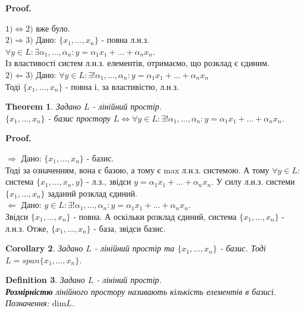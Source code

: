 \documentclass[a4paper, 10pt]{article}
\makeatletter
\def\rightproof{$\boxed{\Rightarrow}$ }
\def\leftproof{$\boxed{\Leftarrow}$ }
\theoremstyle{theoremdd}
\newtheorem{theorem}{Theorem}[subsection]
\newtheorem{definition}[theorem]{Definition}
\newtheorem{corollary}[theorem]{Corollary}
\renewenvironment{proof}[1][Proof.\\]{\par
\pushQED{\hfill \qed}%
\normalfont \topsep6\p@\@plus6\p@\relax
\trivlist
\item\relax
{\bfseries
#1\@addpunct{.}}\hspace\labelsep\ignorespaces
}{%
\popQED\endtrivlist\@endpefalse
}
\makeatother
\begin{document}
	\begin{proof}
	$\boxed{1) \Leftrightarrow 2)}$ вже було.
	\bigskip \\
	$\boxed{2) \Rightarrow 3)}$ Дано: $\{x_1, \dots, x_n\}$ - повна л.н.з.\\
	$\forall y \in L: \exists \alpha_1, \dots, \alpha_n: y = \alpha_1 x_1 + \dots + \alpha_n x_n$.\\
	Із властивості систем л.н.з. елементів, отримаємо, що розклад є єдиним.
	\bigskip \\
	$\boxed{2) \Leftarrow 3)}$ Дано: $\forall y \in L: \exists! \alpha_1, \dots, \alpha_n: y = \alpha_1 x_1 + \dots + \alpha_n x_n$\\
	Тоді $\{x_1, \dots, x_n\}$ - повна і, за властивістю, л.н.з.
	\end{proof}
	\fi
	
	\begin{theorem}
	Задано $L$ - лінійний простір.\\
	$\{x_1,\dots,x_n\}$ - базис простору $L \iff \forall y \in L: \exists! \alpha_1, \dots, \alpha_n: y = \alpha_1 x_1 + \dots + \alpha_n x_n$. 
	\end{theorem}
	
	\begin{proof}
	\rightproof Дано: $\{x_1,\dots,x_n\}$ - базис.\\
	Тоді за означенням, вона є базою, а тому є max л.н.з. системою. А тому $\forall y \in L:$ система $\{x_1,\dots,x_n,y\}$ - л.з., звідси $y = \alpha_1x_1+\dots+\alpha_n x_n$. У силу л.н.з. системи $\{x_1,\dots,x_n\}$ заданий розклад єдиний.
	\bigskip \\
	\leftproof Дано: $y \in L: \exists! \alpha_1, \dots, \alpha_n: y = \alpha_1 x_1 + \dots + \alpha_n x_n$.\\
	Звідси $\{x_1,\dots,x_n\}$ - повна. А оскільки розклад єдиний, система $\{x_1,\dots,x_n\}$ - л.н.з. Отже, $\{x_1,\dots,x_n\}$ - база, звідси базис.
	\end{proof}
	
	\begin{corollary}
	Задано $L$ - лінійний простір та $\{x_1,\dots,x_n\}$ - базис. Тоді $L = span\{x_1,\dots,x_n\}$.
	\end{corollary}
	
	\begin{definition}
	Задано $L$ - лініний простір.\\
	\textbf{Розмірністю} лінійного простору називають кількість елементів в базисі.\\
	Позначення: $\textrm{dim} L$.
	\end{definition}
	
\end{document}
